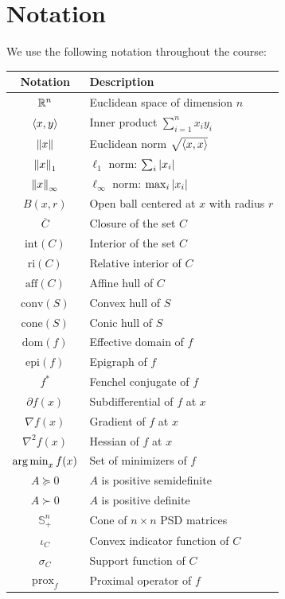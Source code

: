 \section*{Notation}

We use the following notation throughout the course:

\begin{center}
\renewcommand{\arraystretch}{1.4}
\begin{tabular}{cl}
    \toprule
    \textbf{Notation} & \textbf{Description} \\
    \midrule
    $\mathbb{R}^n$ & Euclidean space of dimension $n$ \\
    $\langle x, y \rangle$ & Inner product $\sum_{i=1}^n x_i y_i$ \\
    $\left\| x \right\|$ & Euclidean norm $\sqrt{\langle x, x \rangle}$ \\
    $\left\| x \right\|_1$ & $\ell_1$ norm: $\sum_i \left| x_i \right|$ \\
    $\left\| x \right\|_\infty$ & $\ell_\infty$ norm: $\max_i \left| x_i \right|$ \\
    $B(x,r)$ & Open ball centered at $x$ with radius $r$ \\
    $\overline{C}$ & Closure of the set $C$ \\
    $\mathrm{int}(C)$ & Interior of the set $C$ \\
    $\mathrm{ri}(C)$ & Relative interior of $C$ \\
    $\mathrm{aff}(C)$ & Affine hull of $C$ \\
    $\mathrm{conv}(S)$ & Convex hull of $S$ \\
    $\mathrm{cone}(S)$ & Conic hull of $S$ \\
    $\mathrm{dom}(f)$ & Effective domain of $f$ \\
    $\mathrm{epi}(f)$ & Epigraph of $f$ \\
    $f^*$ & Fenchel conjugate of $f$ \\
    $\partial f(x)$ & Subdifferential of $f$ at $x$ \\
    $\nabla f(x)$ & Gradient of $f$ at $x$ \\
    $\nabla^2 f(x)$ & Hessian of $f$ at $x$ \\
    $\operatorname*{arg\,min}_{x} f(x)$ & Set of minimizers of $f$ \\
    $A \succeq 0$ & $A$ is positive semidefinite \\
    $A \succ 0$ & $A$ is positive definite \\
    $\mathbb{S}^n_+$ & Cone of $n \times n$ PSD matrices \\
    $\iota_C$ & Convex indicator function of $C$ \\
    $\sigma_C$ & Support function of $C$ \\
    $\mathrm{prox}_f$ & Proximal operator of $f$ \\
    \bottomrule
\end{tabular}
\end{center}

